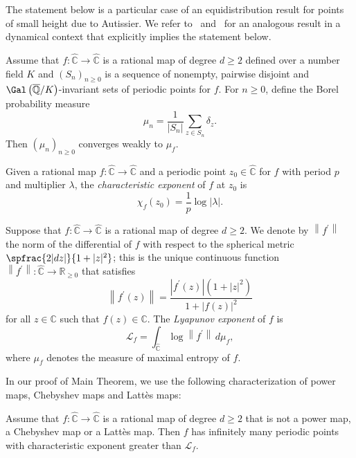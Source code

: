 The statement below is a particular case of an equidistribution result for points of small height due to Autissier. We refer to~\cite[Th.\,10.24]{BR2010} and~\cite[Th.\,2 \& Th.\,4]{FRL2006} for an analogous result in a dynamical context that explicitly implies the statement below.

\begin{theorem}[{\cite[Prop.\,4.1.4]{A2001}}]
\label{theorem:equidistribution}
Assume that $f \colon \widehat{\mathbb{C}} \to \widehat{\mathbb{C}}$ is a rational map of degree $d \geq 2$ defined over a number field $K$ and $\left(S_{n} \right)_{n \geq 0}$ is a sequence of nonempty, pairwise disjoint and $\Gal\left(\overline{\mathbb{Q}}/K \right)$\nobreakdash-invariant sets of periodic points for $f$. For $n \geq 0$, define the Borel probability measure
\[
\mu_{n} = \frac{1}{\left\lvert S_{n} \right\rvert} \sum_{z \in S_{n}} \delta_{z}.
\]
Then $\left(\mu_{n} \right)_{n \geq 0}$ converges weakly to $\mu_{f}$.
\end{theorem}

Given a rational map $f \colon \widehat{\mathbb{C}} \to \widehat{\mathbb{C}}$ and a periodic point $z_{0} \in \widehat{\mathbb{C}}$ for $f$ with period $p$ and multiplier $\lambda$, the \emph{characteristic exponent} of $f$ at $z_{0}$ is
\[
\chi_{f}(z_{0}) = \frac{1}{p} \log\lvert \lambda \rvert.
\]

Suppose that $f \colon \widehat{\mathbb{C}} \to \widehat{\mathbb{C}}$ is a rational map of degree $d \geq 2$. We denote by $\left\lVert f^{\prime} \right\rVert$ the norm of the differential of $f$ with respect to the spherical metric $\spfrac{2 \lvert dz \rvert}{1 +\lvert z \rvert^{2}}$; this is the unique continuous function $\left\lVert f^{\prime} \right\rVert \colon \widehat{\mathbb{C}} \to \mathbb{R}_{\geq 0}$ that satisfies
\[
\left\lVert f^{\prime}(z) \right\rVert = \frac{\left\lvert f^{\prime}(z) \right\rvert \left(1 +\lvert z \rvert^{2} \right)}{1 +\left\lvert f(z) \right\rvert^{2}}
\]
for all $z \in \mathbb{C}$ such that $f(z) \in \mathbb{C}$. The \emph{Lyapunov exponent} of $f$ is
\[
\mathcal{L}_{f} = \int_{\widehat{\mathbb{C}}} \log\left\lVert f^{\prime} \right\rVert \, d\mu_{f},
\]
where $\mu_{f}$ denotes the measure of maximal entropy of $f$.

In our proof of Main Theorem, we use the following characterization of power maps, Chebyshev maps and Lattès maps:

\begin{theorem}[{\cite[Prop.\,4]{Z2014}}]
\label{theorem:exceptional}
Assume that $f \colon \widehat{\mathbb{C}} \to \widehat{\mathbb{C}}$ is a rational map of degree $d \geq 2$ that is not a power map, a Chebyshev map or a Lattès map. Then $f$ has infinitely many periodic points with characteristic exponent greater than $\mathcal{L}_{f}$.
\end{theorem}

